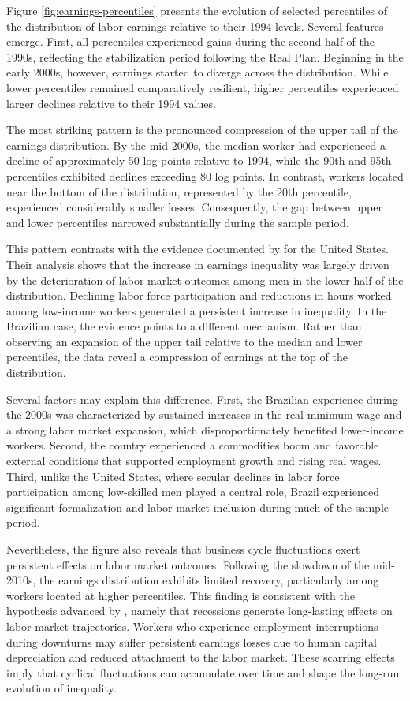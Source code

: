 \documentclass[12pt]{article}
\newcommand{\citeonline}[1]{\citet{#1}}
\begin{document}
	Figure \ref{fig:earnings-percentiles} presents the evolution of selected percentiles of the distribution of labor earnings relative to their 1994 levels. Several features emerge. First, all percentiles experienced gains during the second half of the 1990s, reflecting the stabilization period following the Real Plan. Beginning in the early 2000s, however, earnings started to diverge across the distribution. While lower percentiles remained comparatively resilient, higher percentiles experienced larger declines relative to their 1994 values.
	
	The most striking pattern is the pronounced compression of the upper tail of the earnings distribution. By the mid-2000s, the median worker had experienced a decline of approximately 50 log points relative to 1994, while the 90th and 95th percentiles exhibited declines exceeding 80 log points. In contrast, workers located near the bottom of the distribution, represented by the 20th percentile, experienced considerably smaller losses. Consequently, the gap between upper and lower percentiles narrowed substantially during the sample period.
	
	This pattern contrasts with the evidence documented by \citeonline{heathcote2020rise} for the United States. Their analysis shows that the increase in earnings inequality was largely driven by the deterioration of labor market outcomes among men in the lower half of the distribution. Declining labor force participation and reductions in hours worked among low-income workers generated a persistent increase in inequality. In the Brazilian case, the evidence points to a different mechanism. Rather than observing an expansion of the upper tail relative to the median and lower percentiles, the data reveal a compression of earnings at the top of the distribution.
	
	Several factors may explain this difference. First, the Brazilian experience during the 2000s was characterized by sustained increases in the real minimum wage and a strong labor market expansion, which disproportionately benefited lower-income workers. Second, the country experienced a commodities boom and favorable external conditions that supported employment growth and rising real wages. Third, unlike the United States, where secular declines in labor force participation among low-skilled men played a central role, Brazil experienced significant formalization and labor market inclusion during much of the sample period.
	
	Nevertheless, the figure also reveals that business cycle fluctuations exert persistent effects on labor market outcomes. Following the slowdown of the mid-2010s, the earnings distribution exhibits limited recovery, particularly among workers located at higher percentiles. This finding is consistent with the hypothesis advanced by \citeonline{heathcote2020rise}, namely that recessions generate long-lasting effects on labor market trajectories. Workers who experience employment interruptions during downturns may suffer persistent earnings losses due to human capital depreciation and reduced attachment to the labor market. These scarring effects imply that cyclical fluctuations can accumulate over time and shape the long-run evolution of inequality.
	
\end{document}
